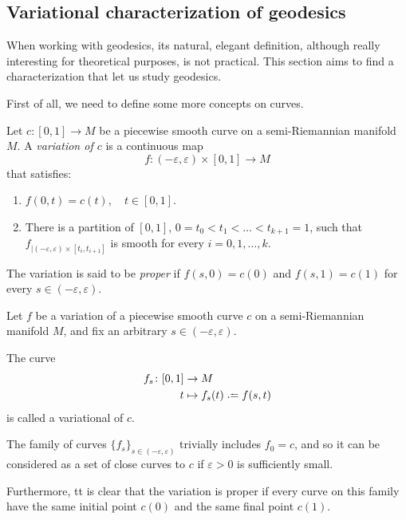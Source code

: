 \subsection{Variational characterization of geodesics}

When working with geodesics, its natural, elegant definition, although really interesting for theoretical purposes, is not practical. This section aims to find a characterization that let us study geodesics.

First of all, we need to define some more concepts on curves.

\begin{definition}
	Let $c \colon [0,1] \to M$ be a piecewise smooth curve on a semi-Riemannian manifold $M$. A \emph{variation of $c$} is a continuous map
	\[
		f \colon (-\varepsilon, \varepsilon) \times [0,1] \to M
	\]
	that satisfies:
	\begin{enumerate}
		\item $f(0,t) = c(t), \quad t\in[0,1]$.
		\item There is a partition of $[0,1]$, $0 = t_0 < t_1 < \dots < t_{k+1} = 1$, such that $f_{|(-\varepsilon, \varepsilon) \times [t_i,t_{i+1}]}$ is smooth for every $i = 0, 1, \dots, k$.
	\end{enumerate}

	The variation is said to be \emph{proper} if $f(s,0) = c(0)$ and $f(s,1) = c(1)$ for every $s \in (-\varepsilon, \varepsilon)$.
\end{definition}

\begin{definition}[Variational of $c$]
	Let $f$ be a variation of a piecewise smooth curve $c$ on a semi-Riemannian manifold $M$, and fix an arbitrary $s \in (-\varepsilon, \varepsilon)$.
	
	The curve
	\begin{align*}
		f_s \colon [0,1] &\to M \\
		t &\mapsto f_s(t) \defeq f(s,t)
	\end{align*}
	is called a variational of $c$.
\end{definition}

The family of curves $\{f_s\}_{s\in (-\varepsilon, \varepsilon)}$ trivially includes $f_0 = c$, and so it can be considered as a set of close curves to $c$ if $\varepsilon > 0$ is sufficiently small.

Furthermore, tt is clear that the variation is proper if every curve on this family have the same initial point $c(0)$ and the same final point $c(1)$.

